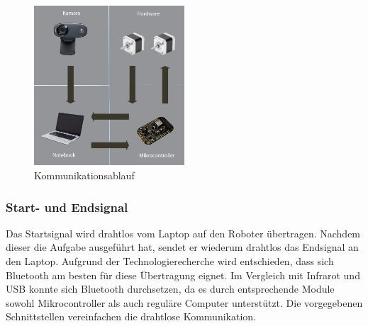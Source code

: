 \begin{figure}[h!]          
	\centering             
	\includegraphics[width=0.5\textwidth]{fig/kommunikationsablauf.jpg}    
	\caption{Kommunikationsablauf}
	
	\label{fig:Kommunikationsablauf}
\end{figure}
\noindent
\subsubsection{Start- und Endsignal}
Das Startsignal wird drahtlos vom Laptop auf den Roboter übertragen. Nachdem 
dieser die Aufgabe ausgeführt hat, sendet er wiederum drahtlos das Endsignal 
an den Laptop. Aufgrund der Technologierecherche wird entschieden, dass 
sich Bluetooth am besten für diese Übertragung eignet. Im Vergleich mit 
Infrarot und USB konnte sich Bluetooth durchsetzen, da es durch entsprechende 
Module sowohl Mikrocontroller als auch reguläre Computer unterstützt. Die 
vorgegebenen Schnittstellen vereinfachen die drahtlose Kommunikation.

